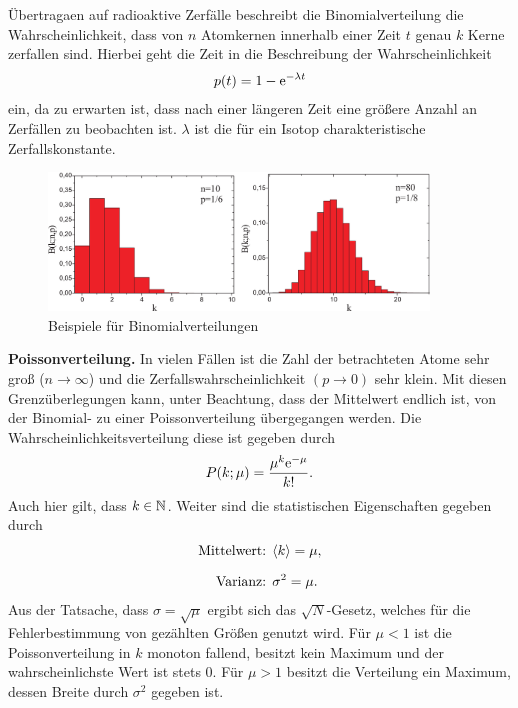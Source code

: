 Übertragaen auf radioaktive Zerfälle beschreibt die Binomialverteilung die Wahrscheinlichkeit, dass von $n$ Atomkernen innerhalb einer Zeit $t$ genau $k$ Kerne zerfallen sind. Hierbei geht die Zeit in die Beschreibung der Wahrscheinlichkeit
\begin{align}
  p(t) = 1 - \text{e}^{-\lambda t}
\end{align} 
ein, da zu erwarten ist, dass nach einer längeren Zeit eine größere Anzahl an Zerfällen zu beobachten ist. $\lambda$ ist die für ein Isotop charakteristische Zerfallskonstante.

\begin{figure}[H]
  \centering
  \includegraphics[width=0.9\textwidth]{files/binom_distr_examples.png}
  \caption{Beispiele für Binomialverteilungen}
  \label{fig:binom_distr_examples}
\end{figure}

\textbf{Poissonverteilung.} In vielen Fällen ist die Zahl der betrachteten Atome sehr groß ($n \to \infty$) und die Zerfallswahrscheinlichkeit $(p \to 0)$ sehr klein. Mit diesen Grenzüberlegungen kann, unter Beachtung, dass der Mittelwert endlich ist, von der Binomial- zu einer Poissonverteilung übergegangen werden. Die Wahrscheinlichkeitsverteilung diese ist gegeben durch
\begin{align}
  P(k;\mu) = \frac{\mu^k \text{e}^{-\mu}}{k!}. \label{eq:poisson_distr}
\end{align}
Auch hier gilt, dass $k \in \mathbb{N}$. Weiter sind die statistischen Eigenschaften gegeben durch
\begin{align}
  \text{Mittelwert: }& \langle k \rangle = \mu,\\[0.6em]
  \text{Varianz: }& \sigma^2 = \mu.
\end{align}
Aus der Tatsache, dass $\sigma = \sqrt{\mu}$ ergibt sich das $\sqrt{N}$-Gesetz, welches für die Fehlerbestimmung von gezählten Größen genutzt wird. Für $\mu < 1$ ist die Poissonverteilung in $k$ monoton fallend, besitzt kein Maximum und der wahrscheinlichste Wert ist stets $0$. Für $\mu > 1$  besitzt die Verteilung ein Maximum, dessen Breite durch $\sigma^2$ gegeben ist.

